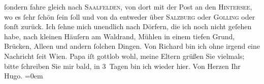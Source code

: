 \begin{ledgroupsized}[t]{13cm}
               ſondern fahre gleich nach \textsc{Saalfelden}, von dort mit der Post an den \textsc{Hintersee}, wo es ſehr ſchön ſein ſoll und von da entweder über \textsc{Salzburg} oder \textsc{Golling} oder ſonſt zurück. Ich ſehne mich unendlich nach Dörfern, die ich noch nicht
               geſehen habe, nach kleinen Häuſern am {\pb}Waldrand, Mühlen in einem tiefen
               Grund, Brücken, Alleen und andern ſolchen Dingen. Von Richard bin ich ohne irgend eine Nachricht ſeit Wien.\pend
           \pstart
           Papa iſt gottlob wohl, meine
                  Eltern grüßen
               Sie vielmals; bitte ſchreiben Sie mir bald, in 3 Tagen bin ich wieder hier.\pend
           \pstart
           Von Herzen Ihr{\\[\baselineskip]}\spacefill\mbox{Hugo.}\pend
           \leftskip=0em{}
         
         \endnumbering{}\end{ledgroupsized}  \newcommand{\dateiname}{L01056}\newcommand{\titel}{Hugo von Hofmannsthal an Arthur Schnitzler, 15. 7. 1900}\newcommand{\editorInnen}{Martin Anton Müller und Gerd-Hermann Susen}
      